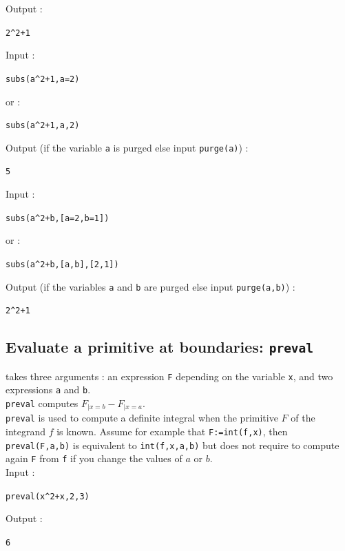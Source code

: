 \documentclass[a4paper,11pt]{book}
\begin{document}
Output  :
\begin{center}{\tt 2\verb|^|2+1}\end{center}
Input :
\begin{center}{\tt subs(a\verb|^|2+1,a=2)}\end{center} 
or :
\begin{center}{\tt subs(a\verb|^|2+1,a,2)}\end{center} 
Output (if the variable {\tt a} is purged else input {\tt purge(a)}) :
\begin{center}{\tt 5}\end{center} 
Input :
\begin{center}{\tt subs(a\verb|^|2+b,[a=2,b=1])}\end{center} 
or :
\begin{center}{\tt subs(a\verb|^|2+b,[a,b],[2,1])}\end{center} 
Output (if the variables {\tt a} and {\tt b} are purged else input 
{\tt purge(a,b)}) :
\begin{center}{\tt 2\verb|^|2+1}\end{center} 

\subsection{Evaluate a primitive at boundaries: {\tt preval}}
 takes three arguments : an expression {\tt F} 
depending on
the variable {\tt x}, and two expressions {\tt a} and {\tt b}.\\
{\tt preval}  computes $F_{|x=b}-F_{|x=a}$.\\
 {\tt preval} is used to compute a definite integral 
when the primitive $F$ of the integrand $f$ is known. Assume
for example that {\tt F:=int(f,x)}, then {\tt preval(F,a,b)} is equivalent
to {\tt int(f,x,a,b)} but does not require to compute again {\tt F}
from {\tt f} if you change the values of $a$ or $b$.\\
Input :
\begin{center}{\tt preval(x\verb|^|2+x,2,3)}\end{center}
Output :
\begin{center}{\tt 6}\end{center}
\end{document}
